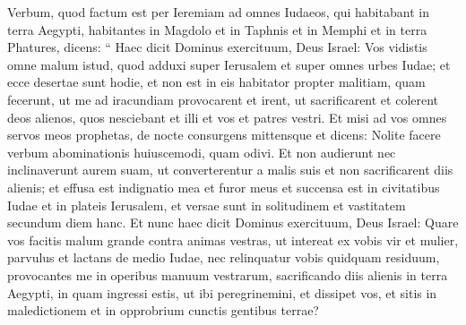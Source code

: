 \begin{biblechapter}
\begin{biblechapter}
\begin{biblechapter}
\begin{biblechapter}
\begin{biblechapter}
\begin{biblechapter}
\begin{biblechapter}
\begin{biblechapter}
\begin{biblechapter}
\begin{biblechapter}
\begin{biblechapter}
\begin{biblechapter}
\begin{biblechapter}
\begin{biblechapter}
\begin{biblechapter}
\begin{biblechapter}
\begin{biblechapter}
\begin{biblechapter}
\begin{biblechapter}
\begin{biblechapter}
\begin{biblechapter}
\begin{biblechapter}
\begin{biblechapter}
\begin{biblechapter}
\begin{biblechapter}
\begin{biblechapter}
\begin{biblechapter}
\begin{biblechapter}
\begin{biblechapter}
\begin{biblechapter}
\begin{biblechapter}
\begin{biblechapter}
\begin{biblechapter}
\begin{biblechapter}
\begin{biblechapter}
\begin{biblechapter}
\begin{biblechapter}
\begin{biblechapter}
\begin{biblechapter}
\begin{biblechapter}
\begin{biblechapter}
\begin{biblechapter}
\begin{biblechapter}
\begin{biblechapter}
\verse Verbum, quod factum est per Ieremiam ad omnes Iudaeos, qui habitabant in terra Aegypti, habitantes in Magdolo et in Taphnis et in Memphi et in terra Phatures, dicens: 
\verse “ Haec dicit Dominus exercituum, Deus Israel: Vos vidistis omne malum istud, quod adduxi super Ierusalem et super omnes urbes Iudae; et ecce desertae sunt hodie, et non est in eis habitator 
\verse propter malitiam, quam fecerunt, ut me ad iracundiam provocarent et irent, ut sacrificarent et colerent deos alienos, quos nesciebant et illi et vos et patres vestri. 
\verse Et misi ad vos omnes servos meos prophetas, de nocte consurgens mittensque et dicens: Nolite facere verbum abominationis huiuscemodi, quam odivi. 
\verse Et non audierunt nec inclinaverunt aurem suam, ut converterentur a malis suis et non sacrificarent diis alienis; 
\verse et effusa est indignatio mea et furor meus et succensa est in civitatibus Iudae et in plateis Ierusalem, et versae sunt in solitudinem et vastitatem secundum diem hanc.
 \verse Et nunc haec dicit Dominus exercituum, Deus Israel: Quare vos facitis malum grande contra animas vestras, ut intereat ex vobis vir et mulier, parvulus et lactans de medio Iudae, nec relinquatur vobis quidquam residuum, 
\verse provocantes me in operibus manuum vestrarum, sacrificando diis alienis in terra Aegypti, in quam ingressi estis, ut ibi peregrinemini, et dissipet vos, et sitis in maledictionem et in opprobrium cunctis gentibus terrae? 

\end{biblechapter}
\end{biblechapter}
\end{biblechapter}
\end{biblechapter}
\end{biblechapter}
\end{biblechapter}
\end{biblechapter}
\end{biblechapter}
\end{biblechapter}
\end{biblechapter}
\end{biblechapter}
\end{biblechapter}
\end{biblechapter}
\end{biblechapter}
\end{biblechapter}
\end{biblechapter}
\end{biblechapter}
\end{biblechapter}
\end{biblechapter}
\end{biblechapter}
\end{biblechapter}
\end{biblechapter}
\end{biblechapter}
\end{biblechapter}
\end{biblechapter}
\end{biblechapter}
\end{biblechapter}
\end{biblechapter}
\end{biblechapter}
\end{biblechapter}
\end{biblechapter}
\end{biblechapter}
\end{biblechapter}
\end{biblechapter}
\end{biblechapter}
\end{biblechapter}
\end{biblechapter}
\end{biblechapter}
\end{biblechapter}
\end{biblechapter}
\end{biblechapter}
\end{biblechapter}
\end{biblechapter}
\end{biblechapter}
